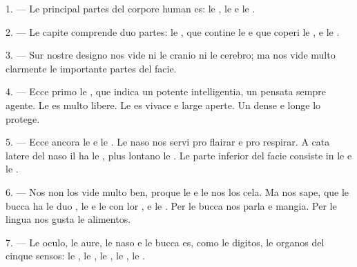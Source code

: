 
\VUsaut{4.0mm}
\VUsaut{2.0mm}

\VUsaut{2.4mm}
\VUsaut{3.0mm}

\VUsaut{3.0mm}

1. --- Le principal partes del corpore human es: le , le
 e le .

2. --- Le capite comprende duo partes: le , que contine le
 e que coperi le , e le .

3. --- Sur nostre designo nos vide ni le cranio ni le cerebro; ma nos vide
multo clarmente le importante partes del facie.

4. --- Ecce primo le , que indica un potente intelligentia, un
pensata sempre agente. Le  es multo libere. Le 
es vivace e large aperte. Un dense  e longe 
lo protege.

5. --- Ecce ancora le  e le . Le naso nos servi
pro flairar e pro respirar. A cata latere del naso il ha le , plus
lontano le . Le parte inferior del facie consiste in le
 e le .

6. --- Nos non los vide multo ben, proque le  e le
 nos los cela. Ma nos sape, que le bucca ha le duo
, le  e le  con
lor , e le . Per le bucca nos parla e mangia. Per
le lingua nos gusta le alimentos.

7. --- Le oculo, le aure, le naso e le bucca es, como le digitos, le organos del
cinque sensos: le , le , le , le
, le .

